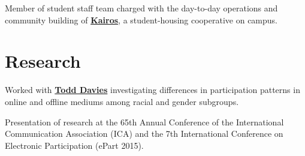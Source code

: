 \documentclass[letterpaper]{deedy-resume} %
\begin{document}
\begin{minipage}[t]{0.66\textwidth}

\begin{tightitemize}
\item Member of student staff team charged with the day-to-day operations and community building of \textbf{\href{http://web.stanford.edu/group/kairos/}{Kairos}}, a student-housing cooperative on campus. 


\end{tightitemize}

\sectionspace %






\section{Research}


\begin{tightitemize}
\item Worked with \textbf{\href{http://www.web.stanford.edu/~davies/}{Todd Davies}} investigating differences in participation patterns in online and offline mediums among racial and gender subgroups. 
\item Presentation of research at the 65th Annual Conference of the International Communication Association (ICA) and the 7th International Conference on Electronic Participation (ePart 2015).
\end{tightitemize}


\end{minipage}
\end{document}
